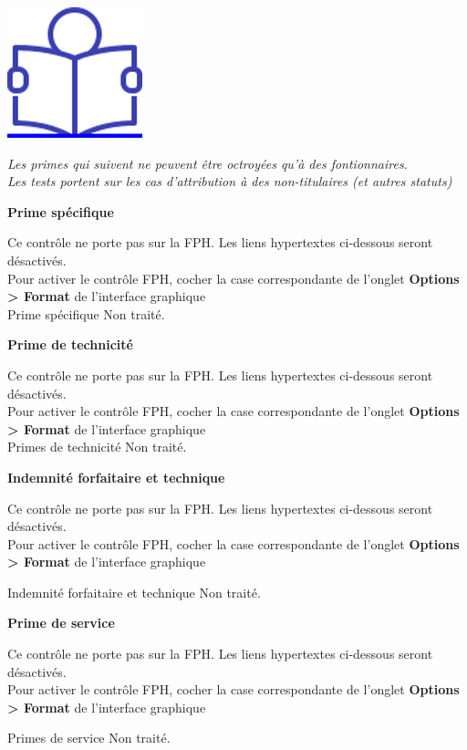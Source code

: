 \href{../Docs/Notices/fiche_FPH.odt}{\includegraphics{icones/Notice.png}}

\emph{Les primes qui suivent ne peuvent être octroyées qu'à des
fontionnaires.}\\
\emph{Les tests portent sur les cas d'attribution à des non-titulaires
(et autres statuts)}

\textbf{Prime spécifique}

Ce contrôle ne porte pas sur la FPH. Les liens hypertextes ci-dessous
seront désactivés.\\
Pour activer le contrôle FPH, cocher la case correspondante de l'onglet
\textbf{Options \textgreater{} Format} de l'interface graphique\\
Prime spécifique Non traité.

\textbf{Prime de technicité}

Ce contrôle ne porte pas sur la FPH. Les liens hypertextes ci-dessous
seront désactivés.\\
Pour activer le contrôle FPH, cocher la case correspondante de l'onglet
\textbf{Options \textgreater{} Format} de l'interface graphique\\
Primes de technicité Non traité.

\textbf{Indemnité forfaitaire et technique}

Ce contrôle ne porte pas sur la FPH. Les liens hypertextes ci-dessous
seront désactivés.\\
Pour activer le contrôle FPH, cocher la case correspondante de l'onglet
\textbf{Options \textgreater{} Format} de l'interface graphique

Indemnité forfaitaire et technique Non traité.

\textbf{Prime de service}

Ce contrôle ne porte pas sur la FPH. Les liens hypertextes ci-dessous
seront désactivés.\\
Pour activer le contrôle FPH, cocher la case correspondante de l'onglet
\textbf{Options \textgreater{} Format} de l'interface graphique

Primes de service Non traité.

